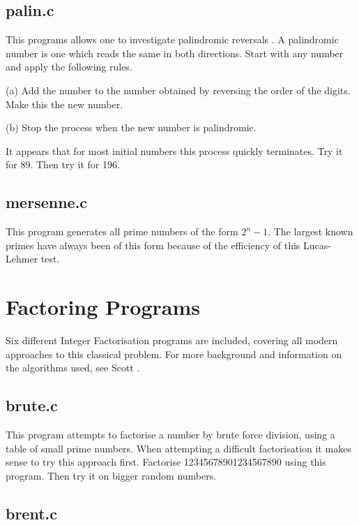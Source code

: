       \subsection{palin.c}

      This  programs  allows one to investigate palindromic reversals 
      \cite{Fred}. A palindromic number is one which reads the same in both 
      directions.  Start with any number and apply the following rules.  

      (a)  Add  the number to the number obtained by reversing the order of 
          the digits. Make this the new number.  

      (b) Stop the process when the new number is palindromic.


      It appears  that  for  most  initial  numbers  this  process  quickly 
      terminates.  Try it for 89. Then try it for 196.  

      \subsection{mersenne.c}

      This program generates all prime  numbers  of  the  form  $2^{n}-1$. The 
      largest  known  primes  have  always been of this form because of the 
      efficiency of this Lucas-Lehmer test.

      \section{Factoring Programs}
 
      Six different Integer Factorisation programs are included, covering all 
      modern approaches to this classical problem. For more background and
      information on the algorithms used, see Scott \cite{Scott89c}.

      \subsection{brute.c}

      This  program attempts to factorise a number by brute force division, 
      using a table of small prime numbers. When  attempting a difficult
      factorisation it makes sense to try this approach first.
      Factorise 12345678901234567890 using  this  program.  Then try it on 
      bigger random numbers.  

      \subsection{brent.c}

